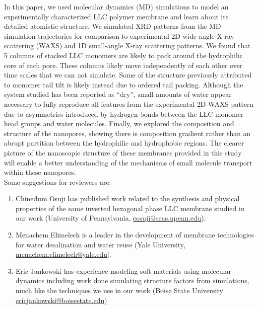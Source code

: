 \documentclass[fontsize=11pt]{article}
\begin{document}
	In this paper, we used molecular dynamics (MD) simulations to model an
	experimentally characterized LLC polymer membrane and learn about its detailed
	atomistic structure. We simulated XRD patterns from the MD simulation trajectories
	for comparison to experimental 2D wide-angle X-ray scattering (WAXS) and 1D 
	small-angle X-ray scattering patterns. We found that 5 columns of stacked LLC 
	monomers are likely to pack around the hydrophilic core of each pore. These 
	columns likely move independently of each other	over time scales that we can not
	simulate. Some of the structure previously attributed to monomer tail tilt is 
	likely instead due to ordered tail packing. Although the system studied	has been
	reported as ``dry'', small amounts of water appear necessary to fully reproduce 
	all features from the experimental 2D-WAXS pattern due to asymmetries introduced 
	by hydrogen bonds between the LLC monomer head groups and water molecules. 
	Finally, we explored the composition and structure of the nanopores, showing there is 
	composition gradient rather than an abrupt partition between the hydrophilic and
	hydrophobic regions. The clearer picture of the nanoscopic structure
	of these membranes provided in this study will enable a better understanding of the
	mechanisms of small molecule transport within these nanopores. \\
	
	\noindent Some suggestions for reviewers are:
	\begin{enumerate}
		\item Chinedum Osuji has published work related to the synthesis and physical
		properties of the same inverted hexagonal phase LLC membrane studied in our 
		work (University of Pennsylvania, 
		\href{mailto:cosuji@seas.upenn.edu}{cosuji@seas.upenn.edu}).
		\item Menachem Elimelech is a leader in the development of membrane technologies
		for	water desalination and water reuse (Yale University, 
		\href{mailto:menachem.elimelech@yale.edu}{menachem.elimelech@yale.edu}).
		\item Eric Jankowski has experience modeling soft materials using molecular dynamics
		including work done simulating structure factors from simulations, much like
		the techniques we use in our work (Boise State University
		\href{mailto:ericjankowski@boisestate.edu}{ericjankowski@boisestate.edu})
		
	\end{enumerate}
	
\end{document}
